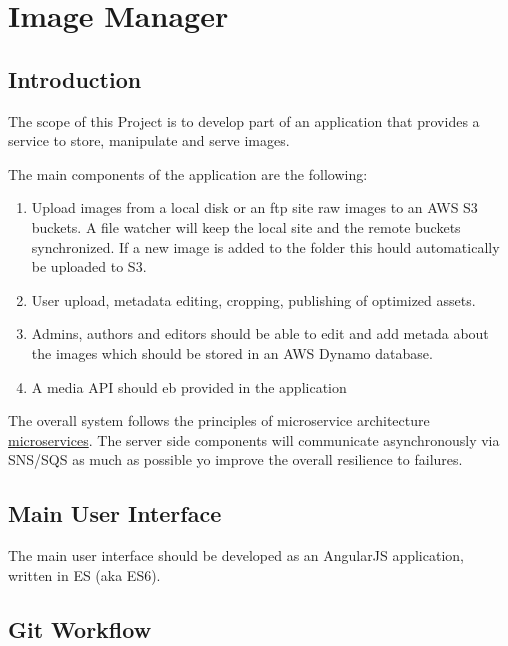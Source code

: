 \chapter{Image Manager}

\section{Introduction}

The scope of this Project is to develop part of an application that provides a service to store,
manipulate and serve images.

The main components of the application are the following:

\begin{enumerate}
\item  Upload images from a local disk or an ftp site raw images to an AWS S3 buckets.
       A file watcher will keep the local site and the remote buckets synchronized. If a new
       image is added to the folder this hould automatically be uploaded to S3.

\item User upload, metadata editing, cropping, publishing of optimized assets. 

\item Admins, authors and editors should be able to edit and add metada about the
      images which should be stored in an AWS Dynamo database. 

\item  A media API should eb provided in the application 

\end{enumerate}

The overall system follows the principles of microservice architecture
\href{http://martinfowler.com/articles/microservices.html}{microservices}. The server side
components will communicate asynchronously via SNS/SQS as much as possible yo improve
the overall resilience to failures.

\section{Main User Interface}

The main user interface should be developed as an AngularJS application, written in ES (aka ES6).

\section{Git Workflow}

